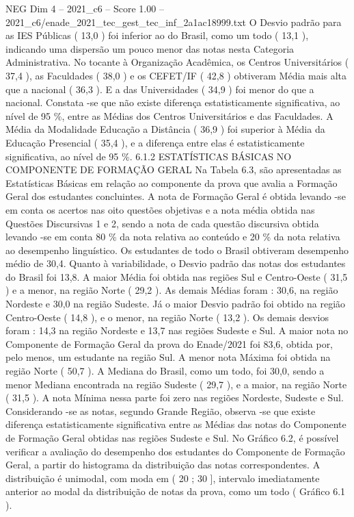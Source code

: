\begin{textsample}{NEG Dim 4 – 2021\_c6 – Score 1.00 – 2021\_c6/enade\_2021\_tec\_gest\_tec\_inf\_2a1ac18999.txt}
O Desvio padrão para as IES Públicas ( 13,0 ) foi inferior ao do Brasil, como um todo ( 13,1 ), indicando uma dispersão um pouco menor das notas nesta Categoria Administrativa.
No tocante à Organização Acadêmica, os Centros Universitários ( 37,4 ), as Faculdades ( 38,0 ) e os CEFET/IF ( 42,8 ) obtiveram Média mais alta que a nacional ( 36,3 ).
E a das Universidades ( 34,9 ) foi menor do que a nacional.
Constata -se que não existe diferença estatisticamente significativa, ao nível de 95 \%, entre as Médias dos Centros Universitários e das Faculdades.
A Média da Modalidade Educação a Distância ( 36,9 ) foi superior à Média da Educação Presencial ( 35,4 ), e a diferença entre elas é estatisticamente significativa, ao nível de 95 \%. 6.1.2 ESTATÍSTICAS BÁSICAS NO COMPONENTE DE FORMAÇÃO GERAL Na Tabela 6.3, são apresentadas as Estatísticas Básicas em relação ao componente da prova que avalia a Formação Geral dos estudantes concluintes.
A nota de Formação Geral é obtida levando -se em conta os acertos nas oito questões objetivas e a nota média obtida nas Questões Discursivas 1 e 2, sendo a nota de cada questão discursiva obtida levando -se em conta 80 \% da nota relativa ao conteúdo e 20 \% da nota relativa ao desempenho linguístico.
Os estudantes de todo o Brasil obtiveram desempenho médio de 30,4.
Quanto à variabilidade, o Desvio padrão das notas dos estudantes do Brasil foi 13,8.
A maior Média foi obtida nas regiões Sul e Centro-Oeste ( 31,5 ) e a menor, na região Norte ( 29,2 ).
As demais Médias foram : 30,6, na região Nordeste e 30,0 na região Sudeste.
Já o maior Desvio padrão foi obtido na região Centro-Oeste ( 14,8 ), e o menor, na região Norte ( 13,2 ).
Os demais desvios foram : 14,3 na região Nordeste e 13,7 nas regiões Sudeste e Sul.
A maior nota no Componente de Formação Geral da prova do Enade/2021 foi 83,6, obtida por, pelo menos, um estudante na região Sul.
A menor nota Máxima foi obtida na região Norte ( 50,7 ).
A Mediana do Brasil, como um todo, foi 30,0, sendo a menor Mediana encontrada na região Sudeste ( 29,7 ), e a maior, na região Norte ( 31,5 ).
A nota Mínima nessa parte foi zero nas regiões Nordeste, Sudeste e Sul.
Considerando -se as notas, segundo Grande Região, observa -se que existe diferença estatisticamente significativa entre as Médias das notas do Componente de Formação Geral obtidas nas regiões Sudeste e Sul.
No Gráfico 6.2, é possível verificar a avaliação do desempenho dos estudantes do Componente de Formação Geral, a partir do histograma da distribuição das notas correspondentes.
A distribuição é unimodal, com moda em ( 20 ; 30 ], intervalo imediatamente anterior ao modal da distribuição de notas da prova, como um todo ( Gráfico 6.1 ).

\end{textsample}
